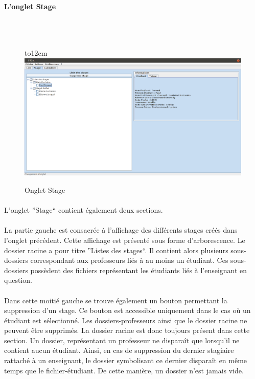 \documentclass[a4paper,10pt]{report}
\begin{document}
	      \newpage
	  \paragraph{L'onglet Stage}
	  ~\\~\\
	      \begin{figure}[H]
		\hbox to12cm{\hss\includegraphics[width=18cm]{Stage.png}\hss}
		\caption{Onglet Stage}
	      \end{figure}
	  
	 
	      \paragraph{}
		L'onglet ''Stage`` contient également deux sections.
		
		
		
	      \paragraph{}
		La partie gauche est consacrée à l'affichage des différents stages créés dans l'onglet précédent.
		Cette affichage est présenté sous forme d'arborescence.
		Le dossier racine a pour titre ''Listes des stages``.
		Il contient alors plusieurs sous-dossiers correspondant aux professeurs liés à au moins un étudiant.
		Ces sous-dossiers possèdent des fichiers représentant les étudiants liés à l'enseignant en question.
		
	      \paragraph{}
		Dans cette moitié gauche se trouve également un bouton permettant la suppression d'un stage.
		Ce bouton est accessible uniquement dans le cas où un étudiant est sélectionné.
		Les dossiers-professeurs ainsi que le dossier racine ne peuvent être supprimés.
		La dossier racine est donc toujours présent dans cette section.
		Un dossier, représentant un professeur ne disparaît que lorsqu'il ne contient aucun étudiant.
		Ainsi, en cas de suppression du dernier stagiaire rattaché à un enseignant, le dossier symbolisant ce dernier disparaît en même temps que le fichier-étudiant.
		De cette manière, un dossier n'est jamais vide.
		
\end{document}
